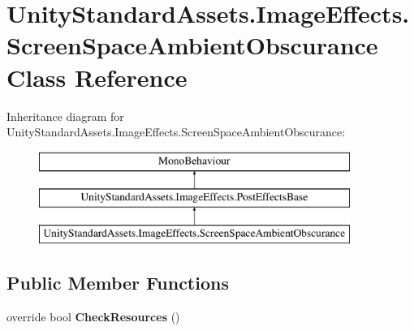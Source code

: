 \hypertarget{class_unity_standard_assets_1_1_image_effects_1_1_screen_space_ambient_obscurance}{}\section{Unity\+Standard\+Assets.\+Image\+Effects.\+Screen\+Space\+Ambient\+Obscurance Class Reference}
\label{class_unity_standard_assets_1_1_image_effects_1_1_screen_space_ambient_obscurance}
Inheritance diagram for Unity\+Standard\+Assets.\+Image\+Effects.\+Screen\+Space\+Ambient\+Obscurance\+:\begin{figure}[H]
\begin{center}
\leavevmode
\includegraphics[height=3.000000cm]{class_unity_standard_assets_1_1_image_effects_1_1_screen_space_ambient_obscurance}
\end{center}
\end{figure}
\subsection*{Public Member Functions}
\begin{DoxyCompactItemize}
\item 
override bool {\bfseries Check\+Resources} ()\hypertarget{class_unity_standard_assets_1_1_image_effects_1_1_screen_space_ambient_obscurance_aa05dd1fc7e3faf1cee9c5bc09e840434}{}\label{class_unity_standard_assets_1_1_image_effects_1_1_screen_space_ambient_obscurance_aa05dd1fc7e3faf1cee9c5bc09e840434}

\end{DoxyCompactItemize}
